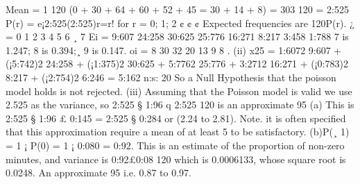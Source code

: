 \documentclass[a4paper,12pt]{article}
\begin{document}
\begin{enumerate}Mean =
1
120
(0 + 30 + 64 + 60 + 52 + 45 = 30 + 14 + 8) =
303
120
= 2:525
P(r) = e¡2:525(2:525)r=r! for r = 0; 1; 2 ¢ ¢ ¢
Expected frequencies are 120P(r).
¿ = 0 1 2 3 4 5 6 ¸ 7
Ei = 9:607 24:258 30:625 25:776 16:271 8:217 3:458 1:788
7 is 1.247; 8 is 0.394;¸ 9 is 0.147.
oi = 8 30 32 20 13 9 8
.
(ii)
x25
=
1:6072
9:607
+
(¡5:742)2
24:258
+
(¡1:375)2
30:625
+
5:7762
25:776
+
3:2712
16:271
+
(¡0:783)2
8:217
+
(¡2:754)2
6:246
= 5:162 n:s:
20
So a Null Hypothesis that the poisson model holds is not rejected.
(iii) Assuming that the Poisson model is valid we use 2.525 as the variance, so
2:525 § 1:96
q
2:525
120 is an approximate 95%
(a) This is 2:525 § 1:96 £ 0:145 = 2:525 § 0:284 or (2.24 to 2.81).
Note. it is often specified that this approximation require a mean of at least 5 to be
satisfactory.
(b)P(¸ 1) = 1 ¡ P(0) = 1 ¡ 0:080 = 0:92. This is an estimate of the proportion
of non-zero minutes, and variance is 0:92£0:08
120 which is 0.0006133, whose square root is
0.0248.
An approximate 95%
i.e. 0.87 to 0.97.
\end{enumerate}
\end{document}
